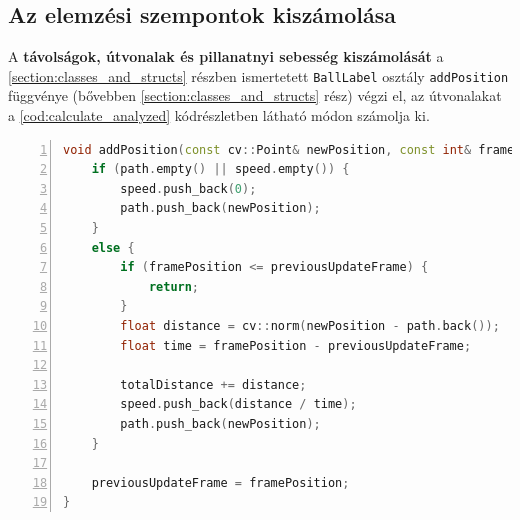 \subsection{Az elemzési szempontok kiszámolása}
A \textbf{távolságok, útvonalak és pillanatnyi sebesség kiszámolását} a \ref{section:classes_and_structs} részben ismertetett \lstinline{BallLabel} osztály \lstinline{addPosition} függvénye (bővebben \ref{section:classes_and_structs} rész) végzi el, az útvonalakat a \ref{cod:calculate_analyzed} kódrészletben látható módon számolja ki.

\vspace{5mm}
\hspace{-10mm}
\begin{minipage}{\linewidth}
\begin{lstlisting}[language=C++, numbers=left, caption={Egy golyó megtett távolságának, útvonalának és sebességének kiszámolása.}, label={cod:calculate_analyzed}]
void addPosition(const cv::Point& newPosition, const int& framePosition) {
    if (path.empty() || speed.empty()) {
        speed.push_back(0);
        path.push_back(newPosition);
    }
    else {
        if (framePosition <= previousUpdateFrame) {
            return;
        }
        float distance = cv::norm(newPosition - path.back());
        float time = framePosition - previousUpdateFrame;

        totalDistance += distance;
        speed.push_back(distance / time);
        path.push_back(newPosition);
    }
    
    previousUpdateFrame = framePosition;
}
\end{lstlisting}
\end{minipage}

